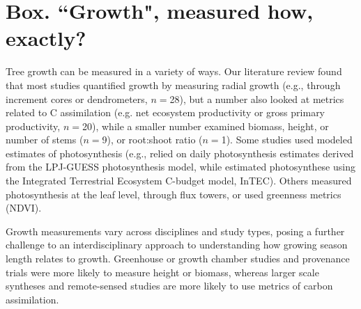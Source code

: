 \documentclass[11pt]{article}
\begin{document}

\newpage
\section{Box. ``Growth", measured how, exactly?}
Tree growth can be measured in a variety of ways. Our literature review found that most studies quantified growth by measuring radial growth (e.g., through increment cores or dendrometers, $n=$28), but a number also looked at metrics related to C assimilation (e.g. net ecosystem productivity or gross primary productivity, $n=$20), while a smaller number examined biomass, height, or number of stems ($n=$9), or root:shoot ratio ($n=$1). Some studies used modeled estimates of photosynthesis 
(e.g., \citet{smith2014implications} relied on daily photosynthesis estimates derived from the LPJ-GUESS photosynthesis model, while \citet{chen2000approaches} estimated photosynthese using the Integrated Terrestrial Ecosystem C-budget model, InTEC). Others measured photosynthesis at the leaf level, through flux towers, or used greenness metrics (NDVI). 

Growth measurements vary across disciplines and study types, posing a further challenge to an interdisciplinary approach to understanding how growing season length relates to growth. Greenhouse or growth chamber studies and provenance trials were more likely to measure height or biomass, whereas larger scale syntheses and remote-sensed studies are more likely to use metrics of carbon assimilation. 
\end{document}
